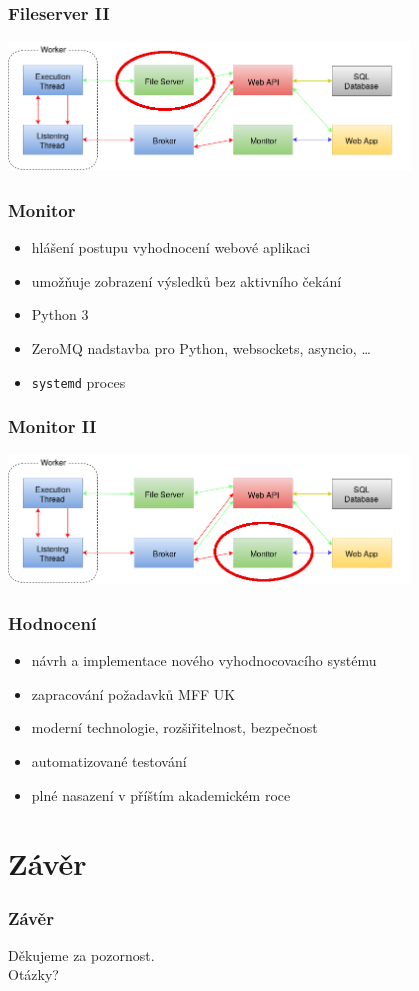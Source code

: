 \documentclass{beamer}
\begin{document}
\begin{frame}
	\frametitle{Fileserver II}
	\begin{center}
		\includegraphics[width=0.8\textwidth]{images/communication-fileserver.png}
	\end{center}
\end{frame}

\begin{frame}
	\frametitle{Monitor}
	\begin{itemize}
		\item hlášení postupu vyhodnocení webové aplikaci
		\item umožňuje zobrazení výsledků bez aktivního čekání
		\item Python 3
		\item ZeroMQ nadstavba pro Python, websockets, asyncio, \dots
		\item \texttt{systemd} proces
	\end{itemize}
\end{frame}

\begin{frame}
	\frametitle{Monitor II}
	\begin{center}
		\includegraphics[width=0.8\textwidth]{images/communication-monitor.png}
	\end{center}
\end{frame}

\begin{frame}
	\frametitle{Hodnocení}
	\begin{itemize}
		\item návrh a implementace nového vyhodnocovacího systému
		\item zapracování požadavků MFF UK
		\item moderní technologie, rozšiřitelnost, bezpečnost
		\item automatizované testování
		\item plné nasazení v příštím akademickém roce
	\end{itemize}
\end{frame}

\section{Závěr}
\begin{frame}
	\frametitle{Závěr}
	\centering
	Děkujeme za pozornost.\\
	\LARGE{Otázky?}
\end{frame}
\end{document}
